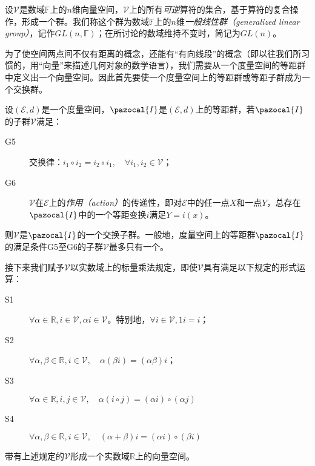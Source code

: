 \documentclass[main.tex]{subfiles}
\begin{document}
\begin{example}
    设$\mathcal{V}$是数域$\mathbb{F}$上的$n$维向量空间，$\mathcal{V}$上的所有\emph{可逆}算符的集合，基于算符的复合操作，形成一个群。我们称这个群为数域$\mathbb{F}$上的$n$维\emph{一般线性群（generalized linear group）}，记作$GL\left(n,\mathbb{F}\right)$；在所讨论的数域维持不变时，简记为$GL\left(n\right)$。
\end{example}

为了使空间两点间不仅有距离的概念，还能有“有向线段”的概念（即以往我们所习惯的，用“向量”来描述几何对象的数学语言），我们需要从一个度量空间的等距群中定义出一个向量空间。因此首先要使一个度量空间上的等距群或等距子群成为一个交换群。

设$\left(\mathcal{E},d\right)$是一个度量空间，$\pazocal{I}$是$\left(\mathcal{E},d\right)$上的等距群，若$\pazocal{I}$的子群$\mathcal{V}$满足：
\begin{description}
    \item[G5] 交换律：$i_1\circ i_2=i_2\circ i_1,\quad \forall i_1,i_2\in\mathcal{V}$；
    \item[G6] $\mathcal{V}$在$\mathcal{E}$上的\emph{作用（action）}的传递性，即对$\mathcal{E}$中的任一点$X$和一点$Y$，总存在$\pazocal{I}$中的一个等距变换$i$满足$Y=i\left(x\right)$。
\end{description}
则$\mathcal{V}$是$\pazocal{I}$的一个交换子群。一般地，度量空间上的等距群$\pazocal{I}$的满足条件G5至G6的子群$\mathcal{V}$最多只有一个。

接下来我们赋予$\mathcal{V}$以实数域上的标量乘法规定，即使$\mathcal{V}$具有满足以下规定的形式运算：
\begin{description}
    \item[S1] $\forall\alpha\in\mathbb{R},i\in\mathcal{V},\alpha i\in\mathcal{V}$。特别地，$\forall i\in\mathcal{V},1i=i$；
    \item[S2] $\forall\alpha,\beta\in\mathbb{R},i\in\mathcal{V},\quad\alpha\left(\beta i\right)=\left(\alpha\beta\right)i$；
    \item[S3] $\forall\alpha\in\mathbb{R},i,j\in\mathcal{V},\quad\alpha\left(i\circ j\right)=\left(\alpha i \right)\circ\left(\alpha j\right)$
    \item[S4] $\forall\alpha,\beta\in\mathbb{R},i\in\mathcal{V},\quad\left(\alpha+\beta\right)i=\left(\alpha i\right)\circ\left(\beta i\right)$
\end{description}
带有上述规定的$\mathcal{V}$形成一个实数域$\mathbb{R}$上的向量空间。
\end{document}
